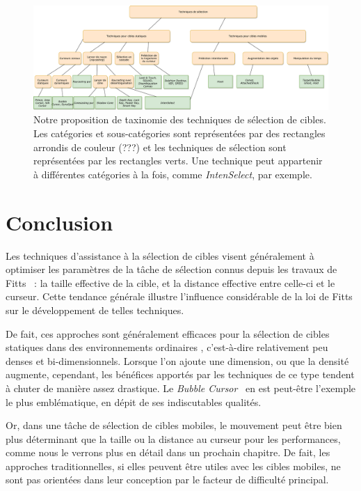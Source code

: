     \begin{landscape}
    
	\begin{figure}[!htb]
		\centering
		\includegraphics[width=\linewidth]{figures/ch2/selTechTree}
		\caption[Taxinomie des techniques de sélection de cibles]{Notre proposition de taxinomie des techniques de sélection de cibles. Les catégories et sous-catégories sont représentées par des rectangles arrondis de couleur (???) et les techniques de sélection sont représentées par les rectangles verts. Une technique peut appartenir à différentes catégories à la fois, comme \emph{IntenSelect}, par exemple.}
		\label{fig:selTaxi}
	\end{figure}	    
    
    \end{landscape}
    
\section{Conclusion}
    Les techniques d'assistance à la sélection de cibles visent généralement à optimiser les paramètres de la tâche de sélection connus depuis les travaux de Fitts~\cite{fitts1954information} : la taille effective de la cible, et la distance effective entre celle-ci et le curseur. Cette tendance générale illustre l'influence considérable de la loi de Fitts sur le développement de telles techniques.
    
    De fait, ces approches sont généralement efficaces pour la sélection de cibles statiques dans des environnements \og ordinaires \fg{}, c'est-à-dire relativement peu denses et bi-dimensionnels. Lorsque l'on ajoute une dimension, ou que la densité augmente, cependant, les bénéfices apportés par les techniques de ce type tendent à chuter de manière assez drastique. Le \emph{Bubble Cursor}~\cite{grossman2005bubble} en est peut-être l'exemple le plus emblématique, en dépit de ses indiscutables qualités.
    
    Or, dans une tâche de sélection de cibles mobiles, le mouvement peut être bien plus déterminant que la taille ou la distance au curseur pour les performances, comme nous le verrons plus en détail dans un prochain chapitre. De fait, les approches traditionnelles, si elles peuvent être utiles avec les cibles mobiles, ne sont pas orientées dans leur conception par le facteur de difficulté principal.
    
